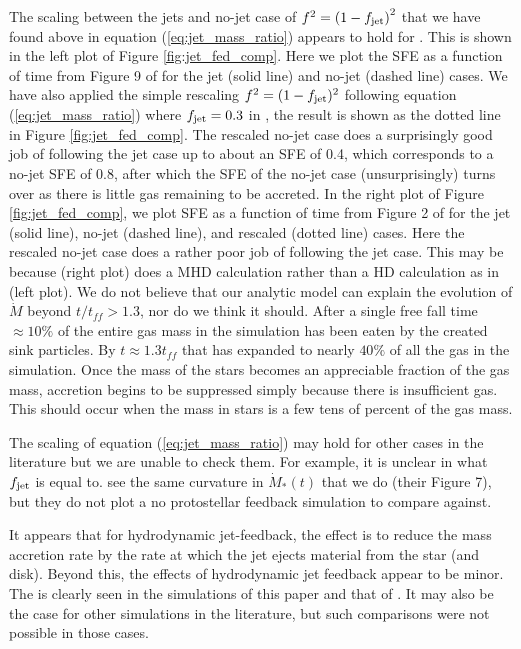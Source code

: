 \documentclass[../dissertation.tex]{subfiles}
\begin{document}
The scaling between the jets and no-jet case of $f^2 = \left(1-f_{\rm jet}\right)^2$ that we have found above in equation (\ref{eq:jet_mass_ratio}) appears to hold for \citet{2014ApJ...790..128F}.  This is shown in the left plot of Figure \ref{fig:jet_fed_comp}.
Here we plot the SFE as a function of time from Figure 9 of \citet{2014ApJ...790..128F} for the jet (solid line) and no-jet (dashed line) cases.
We have also applied the simple rescaling $f^2=(1-f_{\rm jet})^2$ following equation (\ref{eq:jet_mass_ratio}) where $f_{\rm jet} = 0.3$ in \citet{2014ApJ...790..128F}, the result is shown as the dotted line in Figure \ref{fig:jet_fed_comp}.
The rescaled no-jet case does a surprisingly good job of following the jet case up to about an SFE of 0.4, which corresponds to a no-jet SFE of 0.8, after which the SFE of the no-jet case (unsurprisingly) turns over as there is little gas remaining to be accreted.
In the right plot of Figure \ref{fig:jet_fed_comp}, we plot SFE as a function of time from Figure 2 of \citet{2015MNRAS.450.4035F} for the jet (solid line), no-jet (dashed line), and rescaled (dotted line) cases.
Here the rescaled no-jet case does a rather poor job of following the jet case.
This may be because \citet{2014ApJ...790..128F} (right plot) does a MHD calculation rather than a HD calculation as in \citet{2014ApJ...790..128F} (left plot).
We do not believe that our analytic model can explain the evolution of $\dot{M}$ beyond $t/t_{ff} > 1.3$, nor do we think it should.
After a single free fall time $\approx 10\%$ of the entire gas mass in the simulation has been eaten by the created sink particles. By $t \approx 1.3 t_{ff}$ that has expanded to nearly $40\%$ of all the gas in the simulation. 
Once the mass of the stars becomes an appreciable fraction of the gas mass, accretion begins to be suppressed simply because there is insufficient gas.  This should occur when the mass in stars is a few tens of percent of the gas mass.

The scaling of equation (\ref{eq:jet_mass_ratio}) may hold for other cases in the literature but we are unable to check them.
For example, it is unclear in \citet{2010ApJ...709...27W} what $f_{\rm jet}$ is equal to.
\citet{2014MNRAS.439.3420M} see the same curvature in $\dot{M}_*(t)$ that we do (their Figure 7), but they do not plot a no protostellar feedback simulation to compare against.

It appears that for hydrodynamic jet-feedback, the effect is to reduce the mass accretion rate by the rate at which the jet ejects material from the star (and disk).
Beyond this, the effects of hydrodynamic jet feedback appear to be minor.
The is clearly seen in the simulations of this paper and that of \citet{2014ApJ...790..128F}.
It may also be the case for other simulations in the literature, but such comparisons were not possible in those cases.
\end{document}
